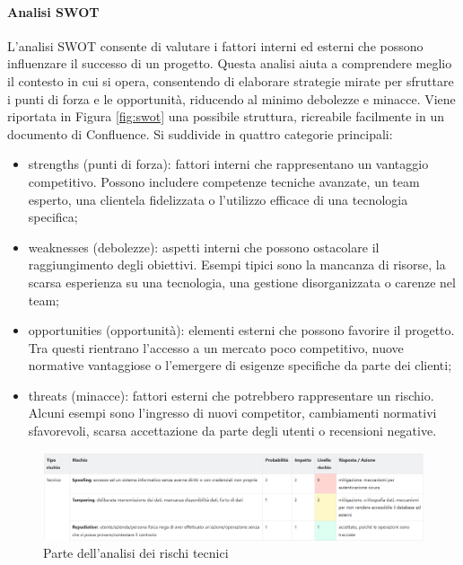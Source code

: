             \paragraph{Analisi SWOT}
            L'analisi SWOT consente di valutare i fattori interni ed esterni che possono influenzare il successo di un progetto.
            Questa analisi aiuta a comprendere meglio il contesto in cui si opera, consentendo di elaborare strategie mirate
            per sfruttare i punti di forza e le opportunità, riducendo al minimo debolezze e minacce. Viene riportata in Figura \ref{fig:swot}
            una possibile struttura, ricreabile facilmente in un documento di Confluence. Si suddivide in quattro categorie principali:
            \begin{itemize}
                \item strengths (punti di forza): fattori interni che rappresentano un vantaggio competitivo. Possono includere
                competenze tecniche avanzate, un team esperto, una clientela fidelizzata o l’utilizzo efficace di una tecnologia specifica;
                \item weaknesses (debolezze): aspetti interni che possono ostacolare il raggiungimento degli obiettivi. Esempi
                tipici sono la mancanza di risorse, la scarsa esperienza su una tecnologia, una gestione disorganizzata o carenze nel team;
                \item opportunities (opportunità): elementi esterni che possono favorire il progetto. Tra questi rientrano l’accesso a
                un mercato poco competitivo, nuove normative vantaggiose o l’emergere di esigenze specifiche da parte dei clienti;
                \item threats (minacce): fattori esterni che potrebbero rappresentare un rischio. Alcuni esempi sono l’ingresso di
                nuovi competitor, cambiamenti normativi sfavorevoli, scarsa accettazione da parte degli utenti o recensioni negative.
            \end{itemize}

            \begin{figure}
                \centering
                \includegraphics[width=\linewidth]{figures/risks.png}
                \caption{Parte dell'analisi dei rischi tecnici}
                \label{fig:risks}
            \end{figure}
